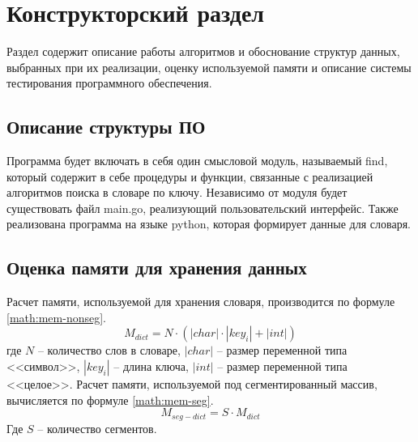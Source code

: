 \chapter{Конструкторский раздел}\label{sec:design}
Раздел содержит описание работы алгоритмов и обоснование структур данных, выбранных при их реализации, оценку используемой памяти и описание системы тестирования программного обеспечения.

\section{Описание структуры ПО}

Программа будет включать в себя один смысловой модуль, назы­ваемый find, который содержит в себе процедуры и функции, связанные с реализацией алгоритмов поиска в словаре по ключу. Независимо от мо­дуля будет существовать файл main.go, реализующий пользовательский интерфейс. Также реализована программа на языке python, которая формирует данные для словаря.

\section{Оценка памяти для хранения данных}

Расчет памяти, используемой для хранения словаря, производится по формуле \ref{math:mem-nonseg}.
\begin{equation}\label{math:mem-nonseg}
M_{dict} = N \cdot (|char| \cdot |key_i| + |int|)
\end{equation}
где $N$ -- количество слов в словаре, $|char|$ -- размер переменной типа <<символ>>, $|key_i|$ -- длина ключа, $|int|$ --  размер переменной типа <<целое>>.
Расчет памяти, используемой под сегментированный массив, вычисляется по формуле \ref{math:mem-seg}.
\begin{equation}\label{math:mem-seg}
M_{seg-dict} = S \cdot M_{dict}
\end{equation}
Где $S$ -- количество сегментов.

